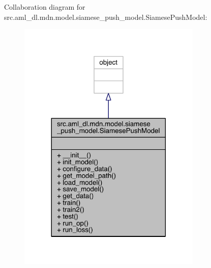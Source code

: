 Collaboration diagram for src.\+aml\+\_\+dl.\+mdn.\+model.\+siamese\+\_\+push\+\_\+model.\+Siamese\+Push\+Model\+:
\nopagebreak
\begin{figure}[H]
\begin{center}
\leavevmode
\includegraphics[width=248pt]{classsrc_1_1aml__dl_1_1mdn_1_1model_1_1siamese__push__model_1_1_siamese_push_model__coll__graph}
\end{center}
\end{figure}
